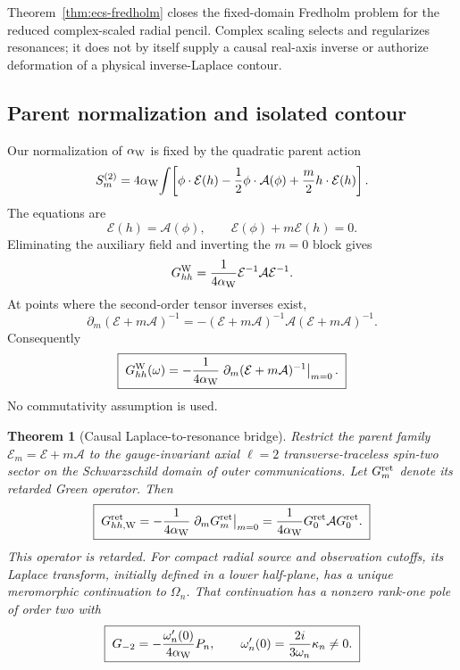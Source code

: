 \documentclass[11pt]{article}
\newtheorem{theorem}{Theorem}[section]
\theoremstyle{remark}
\begin{document}
Theorem~\ref{thm:ecs-fredholm} closes the fixed-domain Fredholm problem for
the reduced complex-scaled radial pencil.  Complex scaling selects and
regularizes resonances; it does not by itself supply a causal real-axis
inverse or authorize deformation of a physical inverse-Laplace contour.

\subsection{Parent normalization and isolated contour}

Our normalization of \(\alpha_{\rm W}\) is fixed by the quadratic parent
action
\[
 S_m^{(2)}
 =4\alpha_{\rm W}\!
 \int\!\left[
 \phi\cdot\mathcal E(h)
 -\frac12\phi\cdot\mathcal A(\phi)
 +\frac m2 h\cdot\mathcal E(h)
 \right].
\]
The equations are
\[
 \mathcal E(h)=\mathcal A(\phi),\qquad
 \mathcal E(\phi)+m\mathcal E(h)=0.
\]
Eliminating the auxiliary field and inverting the \(m=0\) block gives
\[
 G_{hh}^{\rm W}
 =\frac1{4\alpha_{\rm W}}
 \mathcal E^{-1}\mathcal A\mathcal E^{-1}.
\]
At points where the second-order tensor inverses exist,
\[
 \partial_m(\mathcal E+m\mathcal A)^{-1}
 =-(\mathcal E+m\mathcal A)^{-1}
 \mathcal A(\mathcal E+m\mathcal A)^{-1}.
\]
Consequently
\begin{equation}\label{eq:parent-mass-derivative}
 \boxed{\;
 G_{hh}^{\rm W}(\omega)
 =-\frac1{4\alpha_{\rm W}}
 \left.
 \partial_m(\mathcal E+m\mathcal A)^{-1}
 \right|_{m=0}.
 \;}
\end{equation}
No commutativity assumption is used.

\begin{theorem}[Causal Laplace-to-resonance bridge]
\label{thm:causal-laplace}
Restrict the parent family
\(\mathcal E_m=\mathcal E+m\mathcal A\) to the gauge-invariant axial
\(\ell=2\) transverse-traceless spin-two sector on the Schwarzschild
domain of outer communications.  Let \(G_m^{\rm ret}\) denote its retarded
Green operator.  Then
\[
 \boxed{\;
 G_{hh,{\rm W}}^{\rm ret}
 =-\frac1{4\alpha_{\rm W}}
 \left.\partial_mG_m^{\rm ret}\right|_{m=0}
 =\frac1{4\alpha_{\rm W}}
 G_0^{\rm ret}\mathcal A G_0^{\rm ret}.
 \;}
\]
This operator is retarded.  For compact radial source and observation
cutoffs, its Laplace transform, initially defined in a lower half-plane,
has a unique meromorphic continuation to \(\Omega_n\).  That continuation
has a nonzero rank-one pole of order two with
\[
 \boxed{\;
 G_{-2}
 =-\frac{\omega_n'(0)}{4\alpha_{\rm W}}P_n,
 \qquad
 \omega_n'(0)=\frac{2i}{3\omega_n}\kappa_n\ne0.
 \;}
\]
\end{theorem}
\end{document}
